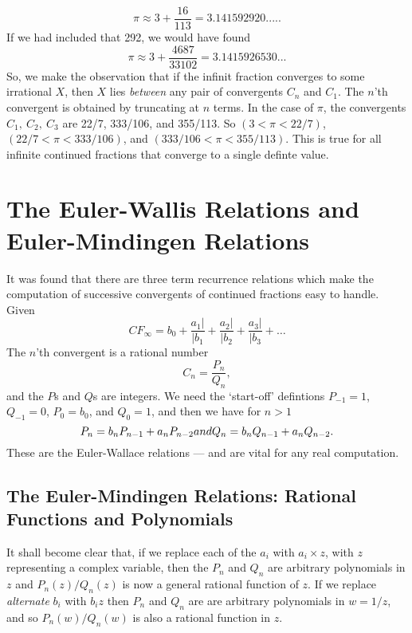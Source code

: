 \documentclass[16pt]{article}
\numberwithin{equation}{section}
\numberwithin{figure}{section}
\numberwithin{figure}{section}
\numberwithin{equation}{section}
\begin{document}
\begin{equation}
\pi \approx 3+\frac{16}{113}=3.141592920.....
\end{equation}
If we had included that 292, we would have found
\begin{equation}
\pi \approx 3+\frac{4687}{33102}=3.1415926530...
\end{equation}
So, we make the observation that if the infinit fraction converges to
some irrational $X$, then $X$ lies {\em between} any pair of convergents $C_n$
and $C_1$. The $n$'th convergent is obtained by truncating at $n$ terms.
In the case of $\pi$, the convergents $C_1,\>C_2,\>C_3$ are
22/7, 333/106, and 355/113. So $(3 < \pi < 22/7)$, $(22/7 < \pi < 333/106)$,
and $(333/106 < \pi < 355/113)$. This is true for all infinite continued fractions
that converge to a single definte value.

\section{The Euler-Wallis Relations and Euler-Mindingen Relations}

It was found that there are three term recurrence relations which make the computation of
successive convergents of continued fractions easy to handle. Given
\begin{equation}
CF_{\infty}=b_0 +\frac{a_1 \vert}{\vert b_1}+\frac{a_2 \vert}{\vert b_2}
+\frac{a_3 \vert}{\vert b_3}+\ldots
\end{equation}
The $n$'th convergent is a rational number
\begin{equation}
C_n=\frac{P_n}{Q_n},
\end{equation}
and the $P$s and $Q$s are integers.
We need the `start-off' defintions $P_{-1}=1$, $Q_{-1}=0$, $P_0=b_0$, and $Q_0=1$,
 and then we have for $n>1$
\begin{equation}
P_n=b_n P_{n-1}+a_n P_{n-2}
$$ and  $$
Q_n=b_n Q_{n-1}+a_n Q_{n-2}.
\end{equation}
These are the Euler-Wallace relations --- and are vital for any real computation.

\subsection{The Euler-Mindingen Relations: Rational Functions and Polynomials}


It shall become clear that, if we replace each of the $a_i$ with $a_i \times z$, with $z$ representing
 a complex variable, then the $P_n$ and $Q_n$ are arbitrary polynomials in $z$ and $P_n(z)/Q_n(z)$
is now a general rational function of $z$. If we replace 
{\em alternate} $b_i$ with $b_i z$ then $P_n$ and $Q_n$ are  are arbitrary polynomials in $w=1/z$,
and so $P_n(w)/Q_n(w)$ is also a rational function in $z$. 
\end{document}
